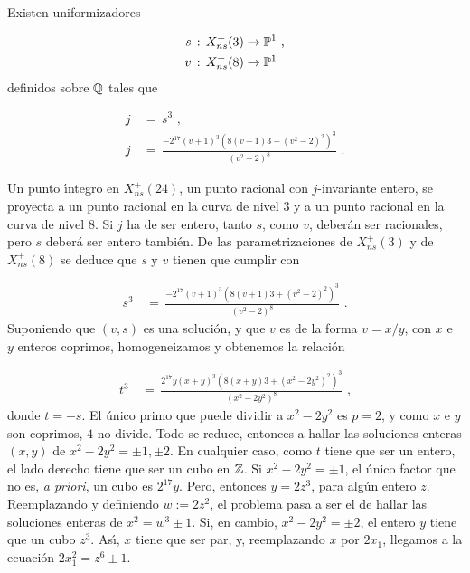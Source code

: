 \begin{teoUnifsOchoYTres}\label{thm:teoUnifsOchoYTres}
 Existen uniformizadores

 \begin{align*}
  s & \,:\,X_{ns}^{+}(3)\rightarrow\mathbb{P}^{1}\text{ ,}\\
  v & \,:\,X_{ns}^{+}(8)\rightarrow\mathbb{P}^{1}
 \end{align*}
definidos sobre $\mathbb{Q}$ tales que

\begin{align*}
 j & \,=\,s^{3}\text{ ,}\\
 j & \,=\,\frac{-2^{17}(v+1)^{3}(8(v+1){3}+(v^{2}-2)^{2})^{3}}{(v^{2}-2)^{8}}
 \text{ .}
\end{align*}
\end{teoUnifsOchoYTres}

Un punto \'{\i}ntegro en $X_{ns}^{+}(24)$, un punto racional con
$j$-invariante entero, se proyecta a un punto racional en la curva de nivel $3$
y a un punto racional en la curva de nivel $8$. Si $j$ ha de ser entero,
tanto $s$, como $v$, deber\'{a}n ser racionales, pero $s$ deber\'{a}
ser entero tambi\'{e}n. De las parametrizaciones de
$X_{ns}^{+}(3)$ y de $X_{ns}^{+}(8)$ se deduce que $s$ y $v$ tienen que cumplir
con

\begin{align}\label{eq:relUnifsTresYOcho}
 s^{3} & \,=\,
 \frac{-2^{17}(v+1)^{3}(8(v+1){3}+(v^{2}-2)^{2})^{3}}{(v^{2}-2)^{8}}
 \text{ .}
\end{align}
Suponiendo que $(v,s)$ es una soluci\'{o}n, y que $v$ es de la forma $v=x/y$,
con $x$ e $y$ enteros coprimos, homogeneizamos y obtenemos la relaci\'{o}n

\begin{align*}
 t^{3} & \,=\,
 \frac{2^{17}y(x+y)^{3}(8(x+y){3}+(x^{2}-2y^{2})^{2})^{3}}{(x^{2}-2y^{2})^{8}}
 \text{ ,}
\end{align*}
donde $t=-s$. El \'{u}nico primo que puede dividir a $x^{2}-2y^{2}$ es $p=2$, y
como $x$ e $y$ son coprimos, $4$ no divide.
Todo se reduce, entonces a hallar las soluciones enteras $(x,y)$
de $x^{2}-2y^{2}=\pm 1,\pm 2$. En cualquier caso, como $t$ tiene que ser un entero,
el lado derecho tiene que ser un cubo en $\mathbb{Z}$. Si $x^{2}-2y^{2}=\pm 1$,
el \'{u}nico factor que no es, \textit{a priori}, un cubo es $2^{17}y$. Pero,
entonces $y=2z^{3}$, para alg\'{u}n entero $z$. Reemplazando y definiendo
$w:=2z^{2}$, el problema pasa a ser el de hallar las soluciones enteras de
$x^{2}=w^{3}\pm 1$. Si, en cambio, $x^{2}-2y^{2}=\pm 2$, el entero $y$ tiene que
un cubo $z^{3}$. As\'{\i}, $x$ tiene que ser par, y, reemplazando $x$ por $2x_{1}$,
llegamos a la ecuaci\'{o}n $2x_{1}^{2}=z^{6}\pm 1$.

